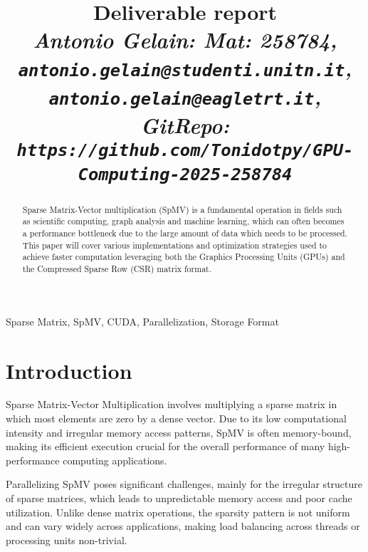 \documentclass[conference]{IEEEtran}
\begin{document}
    \title{Deliverable report \\
    \footnotesize \textit{Antonio Gelain: Mat: 258784, \\
    \texttt{antonio.gelain@studenti.unitn.it}, \\
    \texttt{antonio.gelain@eagletrt.it}, \\
    GitRepo: \texttt{https://github.com/Tonidotpy/GPU-Computing-2025-258784}}}

    \maketitle

    \begin{abstract}
        Sparse Matrix-Vector multiplication (SpMV) is a fundamental operation
        in fields such as scientific computing, graph analysis and machine
        learning, which can often becomes a performance bottleneck due to the
        large amount of data which needs to be processed.
        This paper will cover various implementations and optimization strategies
        used to achieve faster computation leveraging both the Graphics Processing
        Units (GPUs) and the Compressed Sparse Row (CSR) matrix format.
    \end{abstract}

    \begin{IEEEkeywords}
        Sparse Matrix, SpMV, CUDA, Parallelization, Storage Format
    \end{IEEEkeywords}

    \section{Introduction} 
    
    Sparse Matrix-Vector Multiplication involves multiplying a sparse matrix in which
    most elements are zero by a dense vector.
    Due to its low computational intensity and irregular memory access patterns,
    SpMV is often memory-bound, making its efficient execution crucial for the overall
    performance of many high-performance computing applications.

    Parallelizing SpMV poses significant challenges, mainly for the irregular structure
    of sparse matrices, which leads to unpredictable memory access and poor cache
    utilization.
    Unlike dense matrix operations, the sparsity pattern is not uniform and can vary
    widely across applications, making load balancing across threads or processing
    units non-trivial.
\end{document}
